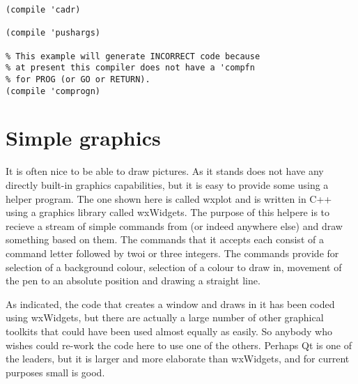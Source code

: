 {\begin{verbatim}
(compile 'cadr)

(compile 'pushargs)

% This example will generate INCORRECT code because
% at present this compiler does not have a 'compfn
% for PROG (or GO or RETURN).
(compile 'comprogn)
\end{verbatim}}


\section{Simple graphics}
It is often nice to be able to draw pictures. As it stands \vsl{} does
not have any directly built-in graphics capabilities, but it is easy
to provide some using a helper program. The one shown here is
called {\tx wxplot} and is written in C++ using a graphics library
called {\tx wxWidgets}\cite{wxWidgets}. The purpose of this helpere is to recieve a
stream of simple commands from \vsl{} (or indeed anywhere else) and
draw something based on them. The commands that it accepts each consist of
a command letter followed by twoi or three integers. The commands provide
for selection of a background colour, selection of a colour to draw in,
movement of the pen to an absolute position and drawing a straight
line.

As indicated, the code that creates a window and draws in it has been
coded using {\tx wxWidgets}, but there are actually a large number of
other graphical toolkits that could have been used almost equally as
easily. So anybody who wishes could re-work the code here to use one
of the others. Perhaps {\tx Qt}\cite{Qt} is one of the leaders, but it
is larger and more elaborate than {\tx wxWidgets}, and for current
purposes small is good.

